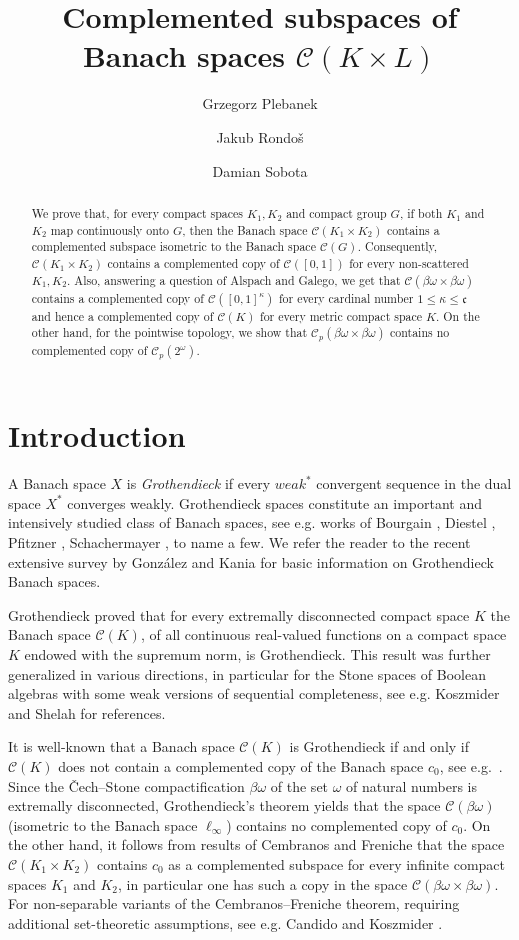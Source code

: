 \documentclass[12pt,fleqn]{amsart}
\title{Complemented subspaces of Banach spaces $\mathcal{C}(K \times L)$}
\author[G.\ Plebanek]{Grzegorz Plebanek}
\author[J.\ Rondo\v{s}]{Jakub Rondo\v{s}}
\author[D.\ Sobota]{Damian Sobota}
\numberwithin{equation}{section}
\theoremstyle{definition}
\def\C{\mathcal C}
\newcommand{\bobo}{\beta\omega\times\beta\omega}
\newcommand{\con}{\mathfrak c}
\begin{document}
\begin{abstract}
We prove that, for every compact spaces $K_1,K_2$ and compact group $G$, if both $K_1$ and $K_2$ map continuously onto $G$, then the Banach space $\C(K_1 \times K_2)$ contains a complemented subspace isometric to the Banach space $\C(G)$. Consequently, $\C(K_1\times K_2)$ contains a complemented copy of $\C([0,1])$ for every non-scattered $K_1,K_2$. Also, answering a question of Alspach and Galego, we get that $\C(\beta\omega\times\beta\omega)$ contains a complemented copy of $\C([0,1]^\kappa)$ for every cardinal number $1\le\kappa\le\con$ and hence a complemented copy of $\C(K)$ for every metric compact space $K$. On the other hand, for the pointwise topology, we show that $\C_p(\beta\omega\times\beta\omega)$ contains no complemented copy of $\C_p(2^\omega)$.
\end{abstract}

\maketitle

\section{Introduction}

A Banach space $X$ is \emph{Grothendieck} if every $weak^\ast$ convergent sequence in the dual space $X^\ast$
converges weakly. Grothendieck spaces constitute an important and intensively studied class of Banach spaces, see e.g. works of Bourgain \cite{Bou83}, Diestel \cite{Die73}, Pfitzner \cite{Pfi94}, Schachermayer \cite{Sch82}, to name a few. We refer the reader to the recent extensive survey by Gonz\'alez and  Kania \cite{GK21} for basic information on Grothendieck Banach spaces.

Grothendieck \cite{Gro53} proved that for every extremally disconnected compact space $K$ the Banach space $\C(K)$, of all continuous real-valued functions on a compact space $K$ endowed with the supremum norm, is Grothendieck. This result was further generalized in various directions, in particular for the Stone spaces of Boolean algebras with some weak versions of sequential completeness, see e.g. Koszmider and Shelah \cite{KS13} for references.

It is well-known that a Banach space $\C(K)$ is Grothendieck if and only if $\C(K)$ does not contain a complemented copy of the Banach space $c_0$, see e.g.\ \cite[Proposition 4.1.2]{GK21}. Since the \v{C}ech--Stone compactification $\beta\omega$ of the set $\omega$ of natural numbers is extremally disconnected, Grothendieck's theorem yields that the space $\C(\beta\omega)$ (isometric to the Banach space $\ell_\infty$) contains no complemented copy of $c_0$. On the other hand, it follows from results of Cembranos \cite{Ce84} and Freniche \cite{Fr84} that the space $\C(K_1\times K_2)$ contains $c_0$ as a complemented subspace for every infinite compact spaces $K_1$ and $K_2$, in particular one has such a copy in the space $\C(\bobo)$. For non-separable variants of the Cembranos--Freniche theorem, requiring additional set-theoretic assumptions, see e.g. Candido and Koszmider \cite{CK16}.
\end{document}

